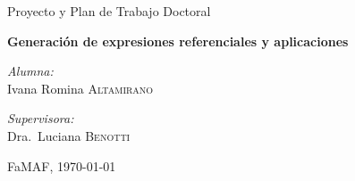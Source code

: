 \documentclass[a4paper,12pt]{article}
\begin{document}
\renewcommand{\refname}{Bibliograf\'ia}

\begin{center}


\vspace{5cm}
{\Large Proyecto y Plan de Trabajo Doctoral}\\[0.5cm]

\vspace{2cm}

{ \Large \bfseries Generaci\'on de expresiones referenciales y aplicaciones} \\ 

\vspace{0.5cm}


\begin{minipage}{0.4\textwidth}
\begin{flushleft} \large
\emph{Alumna:}\\
Ivana Romina \textsc{Altamirano}
\end{flushleft}
\end{minipage}
\begin{minipage}{0.4\textwidth}
\begin{flushright} \large
\emph{Supervisora:} \\
Dra.~Luciana \textsc{Benotti}
\end{flushright}
\end{minipage}

\vspace{2cm}

{\large FaMAF, \today}

\end{center}







%

%
%
\end{document}
